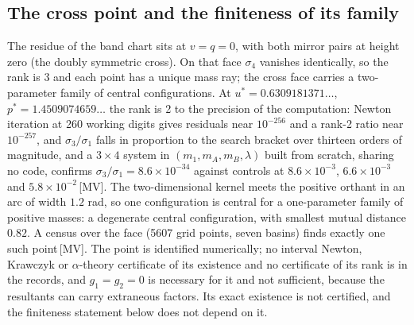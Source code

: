 \documentclass[11pt]{article}
\theoremstyle{definition}
\theoremstyle{remark}
\newcommand{\mk}[1]{\,{\scriptsize[#1]}}
\newcommand{\MV}{\mk{MV}}
\begin{document}
\subsection{The cross point and the finiteness of its family}

The residue of the band chart sits at $v=q=0$, with both mirror pairs at height zero (the doubly symmetric cross).
On that face $\sigma_4$ vanishes identically, so the rank is 3 and each point has a unique mass ray; the cross face carries a
two-parameter family of central configurations. At
$u^{*}=0.6309181371\ldots$, $p^{*}=1.4509074659\ldots$ the rank is 2 to the precision of the computation: Newton iteration at 260 working digits gives residuals near $10^{-256}$ and a rank-2 ratio near $10^{-257}$,
and $\sigma_3/\sigma_1$ falls in proportion to the search bracket over thirteen orders of magnitude, and a $3\times4$ system in $(m_1,m_A,m_B,\lambda)$ built from scratch, sharing
no code, confirms $\sigma_3/\sigma_1=8.6\times10^{-34}$ against controls at $8.6\times10^{-3}$, $6.6\times10^{-3}$ and
$5.8\times10^{-2}$\MV. The two-dimensional kernel meets the positive orthant in an arc of width $1.2$ rad, so one
configuration is central for a one-parameter family of positive masses: a degenerate central configuration, with smallest
mutual distance $0.82$. A census over the face (5607 grid points, seven basins) finds exactly one such point\MV. The point is identified numerically; no interval Newton, Krawczyk or $\alpha$-theory
certificate of its existence and no certificate of its rank is in the records, and $g_1=g_2=0$ is necessary for it and not sufficient, because the resultants can carry extraneous factors. Its exact existence is
not certified, and the finiteness statement below does not depend on it.
\end{document}
